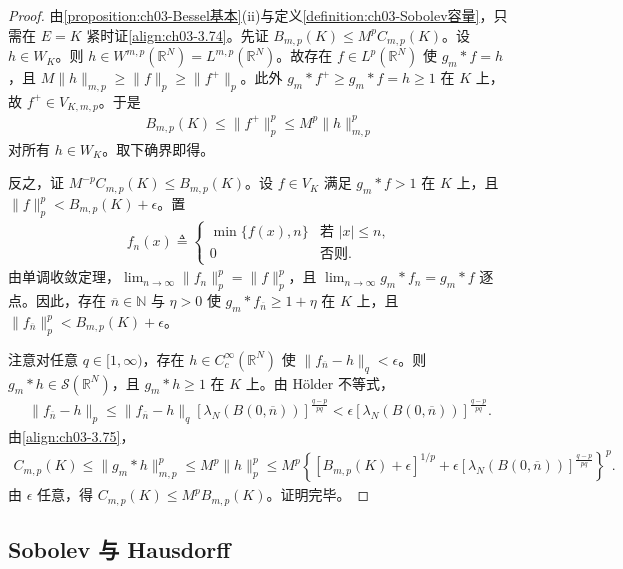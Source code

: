 \documentclass[../../main.tex]{subfiles}%
\begin{document}
\begin{proof}
由\cref{proposition:ch03-Bessel基本}(ii)与定义\ref{definition:ch03-Sobolev容量}，只需在 $E=K$ 紧时证\eqref{align:ch03-3.74}。先证 $B_{m,p}(K)\leqslant M^pC_{m,p}(K)$。设 $h\in W_K$。则 $h\in W^{m,p}(\mathbb{R}^N)=L^{m,p}(\mathbb{R}^N)$。故存在 $f\in L^p(\mathbb{R}^N)$ 使 $g_m*f=h$，且 $M\|h\|_{m,p}\geqslant\|f\|_p\geqslant\|f^+\|_p$。此外 $g_m*f^+\geqslant g_m*f=h\geqslant1$ 在 $K$ 上，故 $f^+\in V_{K,m,p}$。于是
\begin{align*}
B_{m,p}(K)\leqslant\|f^+\|_p^p\leqslant M^p\|h\|_{m,p}^p
\end{align*}
对所有 $h\in W_K$。取下确界即得。

反之，证 $M^{-p}C_{m,p}(K)\leqslant B_{m,p}(K)$。设 $f\in V_K$ 满足 $g_m*f>1$ 在 $K$ 上，且 $\|f\|_p^p<B_{m,p}(K)+\epsilon$。置
\begin{align*}
f_n(x)\triangleq \begin{cases}
\min\{f(x),n\} & \text{若 }|x|\leqslant n,\\
0 & \text{否则}.
\end{cases}
\end{align*}
由单调收敛定理，$\lim_{n\to\infty}\|f_n\|_p^p=\|f\|_p^p$，且 $\lim_{n\to\infty}g_m*f_n=g_m*f$ 逐点。因此，存在 $\overline n\in\mathbb{N}$ 与 $\eta>0$ 使 $g_m*f_{\overline n}\geqslant1+\eta$ 在 $K$ 上，且 $\|f_{\overline n}\|_p^p<B_{m,p}(K)+\epsilon$。

注意对任意 $q\in[1,\infty)$，存在 $h\in C^\infty_c(\mathbb{R}^N)$ 使 $\|f_{\overline n}-h\|_q<\epsilon$。则 $g_m*h\in\mathcal{S}(\mathbb{R}^N)$，且 $g_m*h\geqslant1$ 在 $K$ 上。由 Hölder 不等式，
\begin{align}
\|f_{\overline n}-h\|_p\leqslant\|f_{\overline n}-h\|_q[\lambda_N(B(0,\overline n))]^{\frac{q-p}{pq}}<\epsilon[\lambda_N(B(0,\overline n))]^{\frac{q-p}{pq}}.\label{align:ch03-3.75}
\end{align}
由\eqref{align:ch03-3.75}，
\begin{align*}
C_{m,p}(K)\leqslant\|g_m*h\|_{m,p}^p\leqslant M^p\|h\|_p^p
\leqslant M^p\left\{[B_{m,p}(K)+\epsilon]^{1/p}+\epsilon[\lambda_N(B(0,\overline n))]^{\frac{q-p}{pq}}\right\}^p.
\end{align*}
由 $\epsilon$ 任意，得 $C_{m,p}(K)\leqslant M^pB_{m,p}(K)$。证明完毕。
\end{proof}

\subsection{Sobolev 与 Hausdorff}\label{subsection:ch03-SobolevHausdorff}
\end{document}
